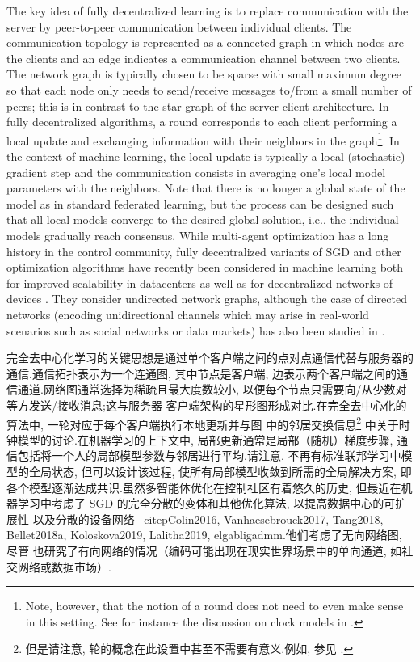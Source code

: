 The key idea of fully decentralized learning is to replace communication with the server by peer-to-peer communication between individual clients. The communication topology is represented as a connected graph in which nodes are the clients and an edge indicates a communication channel between two clients. The network graph is typically chosen to be sparse with small maximum degree so that each node only needs to send/receive messages to/from a small number of peers; this is in contrast to the star graph of the server-client architecture. In fully decentralized algorithms, a round corresponds to each client performing a local update and exchanging information with their neighbors in the graph\footnote{Note, however, that the notion of a round does not need to even make sense in this setting. See for instance the discussion on clock models in \citep{Boyd2006}.}. In the context of machine learning, the local update is typically a local (stochastic) gradient step and the communication consists in averaging one's local model parameters with the neighbors. Note that there is no longer a global state of the model as in standard federated learning, but the process can be designed such that all local models converge to the desired global solution, i.e., the individual models gradually reach consensus. While multi-agent optimization has a long history in the control community, fully decentralized variants of SGD and other optimization algorithms have recently been considered in machine learning both for improved scalability in datacenters \citep{assran2019stochastic} as well as for decentralized networks of devices \citep{Colin2016, Vanhaesebrouck2017, Tang2018, Bellet2018a, Koloskova2019, Lalitha2019, elgabligadmm}. They consider undirected network graphs, although the case of directed networks (encoding unidirectional channels which may arise in real-world scenarios such as social networks or data markets) has also been studied in \citep{assran2019stochastic, he2019central}.

完全去中心化学习的关键思想是通过单个客户端之间的点对点通信代替与服务器的通信.通信拓扑表示为一个连通图, 其中节点是客户端, 边表示两个客户端之间的通信通道.网络图通常选择为稀疏且最大度数较小, 以便每个节点只需要向/从少数对等方发送/接收消息;这与服务器-客户端架构的星形图形成对比.在完全去中心化的算法中, 一轮对应于每个客户端执行本地更新并与图 中的邻居交换信息\footnote{但是请注意, 轮的概念在此设置中甚至不需要有意义.例如, 参见 \citep{Boyd2006}.} 中关于时钟模型的讨论.在机器学习的上下文中, 局部更新通常是局部（随机）梯度步骤, 通信包括将一个人的局部模型参数与邻居进行平均.请注意, 不再有标准联邦学习中模型的全局状态, 但可以设计该过程, 使所有局部模型收敛到所需的全局解决方案, 即各个模型逐渐达成共识.虽然多智能体优化在控制社区有着悠久的历史, 但最近在机器学习中考虑了 SGD 的完全分散的变体和其他优化算法, 以提高数据中心的可扩展性 \citep{assran2019stochastic} 以及分散的设备网络 \ citep{Colin2016, Vanhaesebrouck2017, Tang2018, Bellet2018a, Koloskova2019, Lalitha2019, elgabligadmm}.他们考虑了无向网络图, 尽管 \citep{assran2019stochastic, he2019central} 也研究了有向网络的情况（编码可能出现在现实世界场景中的单向通道, 如社交网络或数据市场）.

